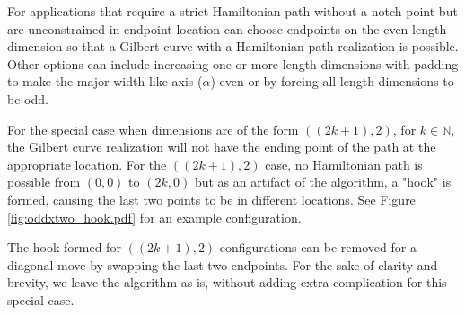 For applications that require a strict Hamiltonian path without a notch point but are unconstrained in endpoint location can choose
endpoints on the even length dimension so that a Gilbert curve with a Hamiltonian path realization is possible.
Other options can include increasing one or more length dimensions with padding to make the major width-like axis ($\alpha$) even or
by forcing all length dimensions to be odd.

For the special case when dimensions are of the form $((2k+1),2)$, for $k \in \mathbb{N}$, the Gilbert curve realization will
not have the ending point of the path at the appropriate location.
For the $((2k+1),2)$ case, no Hamiltonian path is possible from $(0,0)$ to $(2k,0)$ but as an artifact of the algorithm,
a "hook" is formed, causing the last two points to be in different locations.
See Figure \ref{fig:oddxtwo_hook.pdf} for an example configuration.

The hook formed for $((2k+1),2)$ configurations can be removed for a diagonal move by swapping the last two endpoints.
For the sake of clarity and brevity, we leave the algorithm as is, without adding extra complication for this special case.



